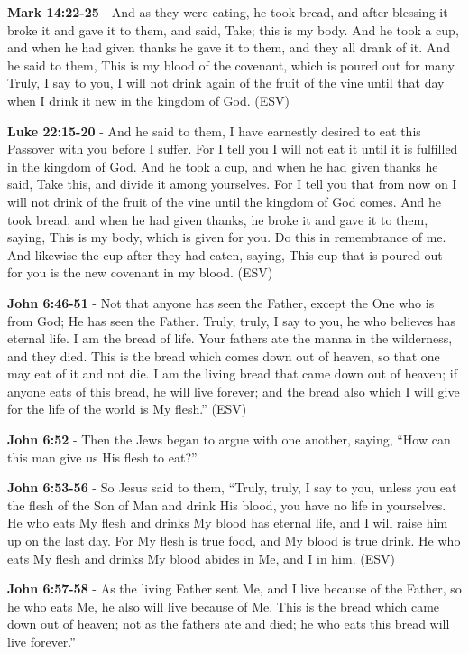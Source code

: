 \documentclass[11pt]{article}
\begin{document}
\textbf{Mark 14:22-25} - And as they were eating, he took bread, and after blessing it broke it and gave it to them, and said, Take; this is my body. And he took a cup, and when he had given thanks he gave it to them, and they all drank of it. And he said to them, This is my blood of the covenant, which is poured out for many. Truly, I say to you, I will not drink again of the fruit of the vine until that day when I drink it new in the kingdom of God. (ESV)

\textbf{Luke 22:15-20} - And he said to them, I have earnestly desired to eat this Passover with you before I suffer. For I tell you I will not eat it until it is fulfilled in the kingdom of God. And he took a cup, and when he had given thanks he said, Take this, and divide it among yourselves. For I tell you that from now on I will not drink of the fruit of the vine until the kingdom of God comes. And he took bread, and when he had given thanks, he broke it and gave it to them, saying, This is my body, which is given for you. Do this in remembrance of me. And likewise the cup after they had eaten, saying, This cup that is poured out for you is the new covenant in my blood. (ESV)

\textbf{John 6:46-51} - Not that anyone has seen the Father, except the One who is from God; He has seen the Father. Truly, truly, I say to you, he who believes has eternal life. I am the bread of life. Your fathers ate the manna in the wilderness, and they died. This is the bread which comes down out of heaven, so that one may eat of it and not die. I am the living bread that came down out of heaven; if anyone eats of this bread, he will live forever; and the bread also which I will give for the life of the world is My flesh.” (ESV)

\textbf{John 6:52} - Then the Jews began to argue with one another, saying, “How can this man give us His flesh to eat?”

\textbf{John 6:53-56} - So Jesus said to them, “Truly, truly, I say to you, unless you eat the flesh of the Son of Man and drink His blood, you have no life in yourselves. He who eats My flesh and drinks My blood has eternal life, and I will raise him up on the last day. For My flesh is true food, and My blood is true drink. He who eats My flesh and drinks My blood abides in Me, and I in him. (ESV)

\textbf{John 6:57-58} - As the living Father sent Me, and I live because of the Father, so he who eats Me, he also will live because of Me. This is the bread which came down out of heaven; not as the fathers ate and died; he who eats this bread will live forever.”
\end{document}
